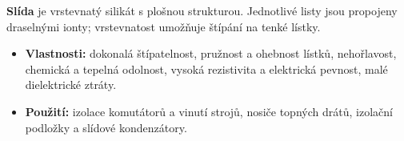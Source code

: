 \textbf{Slída} je vrstevnatý silikát s plošnou strukturou. Jednotlivé listy jsou propojeny draselnými ionty; vrstevnatost umožňuje štípání na tenké lístky.
\begin{itemize}
\item \textbf{Vlastnosti:} dokonalá štípatelnost, pružnost a ohebnost lístků, nehořlavost, chemická a tepelná odolnost, vysoká rezistivita a elektrická pevnost, malé dielektrické ztráty.
\item \textbf{Použití:} izolace komutátorů a vinutí strojů, nosiče topných drátů, izolační podložky a slídové kondenzátory.
\end{itemize}
